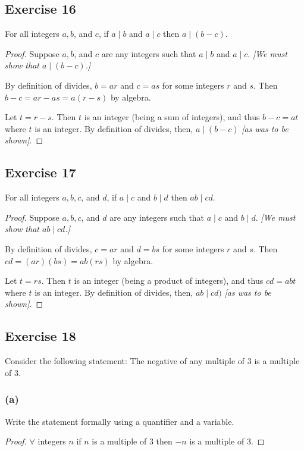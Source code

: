 \documentclass[14pt]{extarticle}
\newcommand{\fa}{\forall}
\begin{document}
\subsection{Exercise 16}
For all integers $a, b$, and $c$, if $a \mid b$ and $a \mid c$ then $a \mid (b - c)$.

\begin{proof}
Suppose $a, b$, and $c$ are any integers such that $a\mid b$ and $a \mid c$. {\it [We must show that $a \mid (b - c)$.]} 

By definition of divides, $b = ar$ and $c = as$ for some integers $r$ and $s$. Then $b - c = ar - as = a(r - s)$ by algebra.

Let $t = r - s$. Then $t$ is an integer (being a sum of integers), and thus $b - c = at$ where $t$ is an integer. By definition of divides, then, $a \mid (b - c)$ {\it [as was to be shown]}.
\end{proof}

\subsection{Exercise 17}
For all integers $a, b, c$, and $d$, if $a \mid c$ and $b \mid d$ then $ab \mid cd$.

\begin{proof}
Suppose $a, b, c$, and $d$ are any integers such that $a \mid c$ and $b \mid d$. {\it [We must show that $ab \mid cd $.]} 

By definition of divides, $c = ar$ and $d = bs$ for some integers $r$ and $s$. Then $cd = (ar)(bs) = ab(rs)$ by algebra.

Let $t = rs$. Then $t$ is an integer (being a product of integers), and thus $cd = abt$ where $t$ is an integer. By definition of divides, then, $ab \mid cd)$ {\it [as was to be shown]}.
\end{proof}

\subsection{Exercise 18}
Consider the following statement: The negative of any multiple of 3 is a multiple of 3.

\subsubsection{(a)}
Write the statement formally using a quantifier and a variable.

\begin{proof}
$\fa$ integers $n$ if $n$ is a multiple of 3 then $-n$ is a multiple of 3.
\end{proof}
\end{document}
